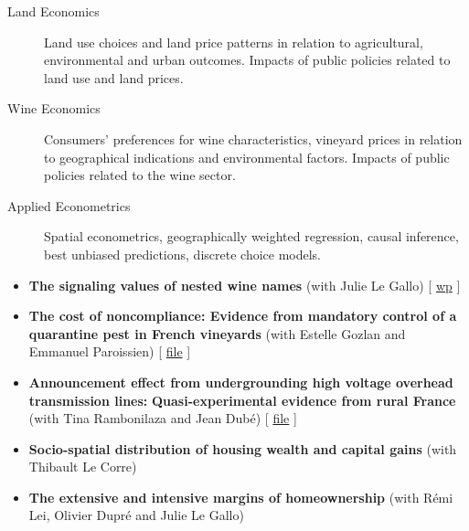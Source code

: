\documentclass[11pt, a4paper]{./style}
\begin{document}
\label{sec:orgdb31701}

\begin{description}
\item[{Land Economics}] Land use choices and land price patterns in
relation to agricultural, environmental and urban
outcomes. Impacts of public policies related to land use and land
prices.
\item[{Wine Economics}] Consumers' preferences for wine characteristics,
vineyard prices in relation to geographical indications and
environmental factors. Impacts of public policies related to the
wine sector.
\item[{Applied Econometrics}] Spatial econometrics, geographically
weighted regression, causal inference, best unbiased predictions,
discrete choice models.
\end{description}

\label{sec:orgc97b57e}

\begin{itemize}
\item \textbf{The signaling values of nested wine names} (with Julie Le
Gallo) [ \href{https://wine-economics.org/wp-content/uploads/2021/05/AAWE\_WP265.pdf}{wp} ]
\item \textbf{The cost of noncompliance: Evidence from mandatory control of a
quarantine pest in French vineyards} (with Estelle Gozlan and
Emmanuel Paroissien) [ \href{doc/RISCA-FILE.pdf}{file} ]
\item \textbf{Announcement effect from undergrounding high voltage overhead
transmission lines:} \textbf{Quasi-experimental evidence from rural
France} (with Tina Rambonilaza and Jean Dubé) [ \href{doc/HVTOL-FILE.pdf}{file} ]
\item \textbf{Socio-spatial distribution of housing wealth and capital gains}
(with Thibault Le Corre)
\item \textbf{The extensive and intensive margins of homeownership} (with Rémi
Lei, Olivier Dupré and Julie Le Gallo)
\end{itemize}

\label{sec:orgd42d2a4}
\label{sec:orgb557a50}
\end{document}
